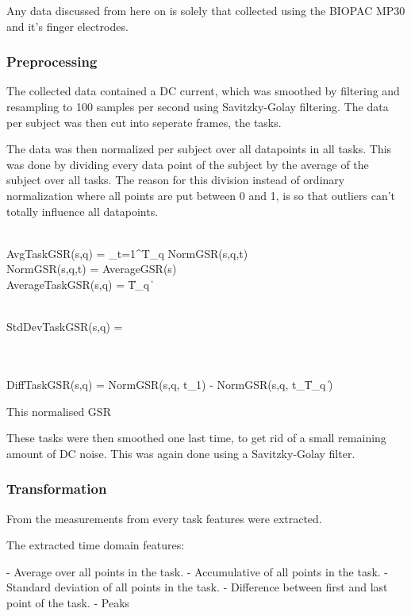 \documentclass[12pt,fleqn,leqno,letterpaper]{article}
\begin{document}
Any data discussed from here on is solely that collected using the BIOPAC MP30 and it's finger electrodes.


\subsubsection{Preprocessing}
The collected data contained a DC current, which was smoothed by filtering and resampling to 100 samples per second using Savitzky-Golay filtering. 
The data per subject was then cut into seperate frames, the tasks. 

The data was then normalized per subject over all datapoints in all tasks. This was done by dividing every data point of the subject by the average of the subject over all tasks. The reason for this division instead of ordinary normalization where all points are put between 0 and 1, is so that outliers can't totally influence all datapoints.

\\

AvgTaskGSR(s,q) =     \sum_{t=1}^{T_q} NormGSR(s,q,t) 
\\

NormGSR(s,q,t) =  {AverageGSR(s)}
\\

AverageTaskGSR(s,q) = 
{\left \| T_q \right \| }

\\
StdDevTaskGSR(s,q) = 

\\
\\

DiffTaskGSR(s,q) = NormGSR(s,q, t_1) - NormGSR(s,q, t_{\left \| T_q \right \|})

This normalised GSR 


These tasks were then smoothed one last time, to get rid of a small remaining amount of DC noise. This was again done using a Savitzky-Golay filter.

\subsubsection{Transformation}
From the measurements from every task features were extracted. 

The extracted time domain features:

- Average over all points in the task.
- Accumulative of all points in the task.
- Standard deviation of all points in the task.
- Difference between first and last point of the task.
- Peaks
\end{document}
